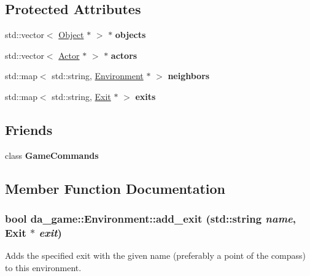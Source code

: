 \subsection*{Protected Attributes}
\begin{DoxyCompactItemize}
\item 
\hypertarget{classda__game_1_1Environment_afd10beaae82f22e4ea970b9a85b1f57c}{
std::vector$<$ \hyperlink{classda__game_1_1Object}{Object} $\ast$ $>$ $\ast$ {\bfseries objects}}
\label{classda__game_1_1Environment_afd10beaae82f22e4ea970b9a85b1f57c}

\item 
\hypertarget{classda__game_1_1Environment_a2d4baf7e9c6a619ef692edb0287f5df7}{
std::vector$<$ \hyperlink{classda__game_1_1Actor}{Actor} $\ast$ $>$ $\ast$ {\bfseries actors}}
\label{classda__game_1_1Environment_a2d4baf7e9c6a619ef692edb0287f5df7}

\item 
\hypertarget{classda__game_1_1Environment_a40544e6d69042fc864b1c8057ad0bc16}{
std::map$<$ std::string, \hyperlink{classda__game_1_1Environment}{Environment} $\ast$ $>$ {\bfseries neighbors}}
\label{classda__game_1_1Environment_a40544e6d69042fc864b1c8057ad0bc16}

\item 
\hypertarget{classda__game_1_1Environment_a332747dd172e39880f0703283e5fcf23}{
std::map$<$ std::string, \hyperlink{classda__game_1_1Exit}{Exit} $\ast$ $>$ {\bfseries exits}}
\label{classda__game_1_1Environment_a332747dd172e39880f0703283e5fcf23}

\end{DoxyCompactItemize}
\subsection*{Friends}
\begin{DoxyCompactItemize}
\item 
\hypertarget{classda__game_1_1Environment_ad58162d418e52e78ef2d13bea08472d4}{
class {\bfseries GameCommands}}
\label{classda__game_1_1Environment_ad58162d418e52e78ef2d13bea08472d4}

\end{DoxyCompactItemize}


\subsection{Member Function Documentation}
\hypertarget{classda__game_1_1Environment_a7b8062cb2c63bb225225a9749da4e8cf}{
\subsubsection[{add\_\-exit}]{\setlength{\rightskip}{0pt plus 5cm}bool da\_\-game::Environment::add\_\-exit (std::string {\em name}, \/  {\bf Exit} $\ast$ {\em exit})}}
\label{classda__game_1_1Environment_a7b8062cb2c63bb225225a9749da4e8cf}
Adds the specified exit with the given name (preferably a point of the compass) to this environment.

